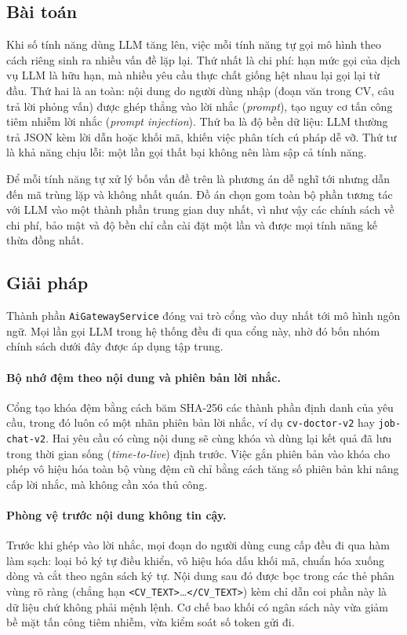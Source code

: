 \documentclass[../DoAn.tex]{subfiles}
\begin{document}
\subsection{Bài toán}

Khi số tính năng dùng LLM tăng lên, việc mỗi tính năng tự gọi mô hình theo cách riêng sinh ra nhiều vấn đề lặp lại. Thứ nhất là chi phí: hạn mức gọi của dịch vụ LLM là hữu hạn, mà nhiều yêu cầu thực chất giống hệt nhau lại gọi lại từ đầu. Thứ hai là an toàn: nội dung do người dùng nhập (đoạn văn trong CV, câu trả lời phỏng vấn) được ghép thẳng vào lời nhắc (\textit{prompt}), tạo nguy cơ tấn công tiêm nhiễm lời nhắc (\textit{prompt injection}). Thứ ba là độ bền dữ liệu: LLM thường trả JSON kèm lời dẫn hoặc khối mã, khiến việc phân tích cú pháp dễ vỡ. Thứ tư là khả năng chịu lỗi: một lần gọi thất bại không nên làm sập cả tính năng.

Để mỗi tính năng tự xử lý bốn vấn đề trên là phương án dễ nghĩ tới nhưng dẫn đến mã trùng lặp và không nhất quán. Đồ án chọn gom toàn bộ phần tương tác với LLM vào một thành phần trung gian duy nhất, vì như vậy các chính sách về chi phí, bảo mật và độ bền chỉ cần cài đặt một lần và được mọi tính năng kế thừa đồng nhất.

\subsection{Giải pháp}

Thành phần \texttt{AiGatewayService} đóng vai trò cổng vào duy nhất tới mô hình ngôn ngữ. Mọi lần gọi LLM trong hệ thống đều đi qua cổng này, nhờ đó bốn nhóm chính sách dưới đây được áp dụng tập trung.

\paragraph{Bộ nhớ đệm theo nội dung và phiên bản lời nhắc.} Cổng tạo khóa đệm bằng cách băm SHA-256 các thành phần định danh của yêu cầu, trong đó luôn có một nhãn phiên bản lời nhắc, ví dụ \texttt{cv-doctor-v2} hay \texttt{job-chat-v2}. Hai yêu cầu có cùng nội dung sẽ cùng khóa và dùng lại kết quả đã lưu trong thời gian sống (\textit{time-to-live}) định trước. Việc gắn phiên bản vào khóa cho phép vô hiệu hóa toàn bộ vùng đệm cũ chỉ bằng cách tăng số phiên bản khi nâng cấp lời nhắc, mà không cần xóa thủ công.

\paragraph{Phòng vệ trước nội dung không tin cậy.} Trước khi ghép vào lời nhắc, mọi đoạn do người dùng cung cấp đều đi qua hàm làm sạch: loại bỏ ký tự điều khiển, vô hiệu hóa dấu khối mã, chuẩn hóa xuống dòng và cắt theo ngân sách ký tự. Nội dung sau đó được bọc trong các thẻ phân vùng rõ ràng (chẳng hạn \texttt{<CV\_TEXT>}\dots\texttt{</CV\_TEXT>}) kèm chỉ dẫn coi phần này là dữ liệu chứ không phải mệnh lệnh. Cơ chế bao khối có ngân sách này vừa giảm bề mặt tấn công tiêm nhiễm, vừa kiểm soát số token gửi đi.
\end{document}
